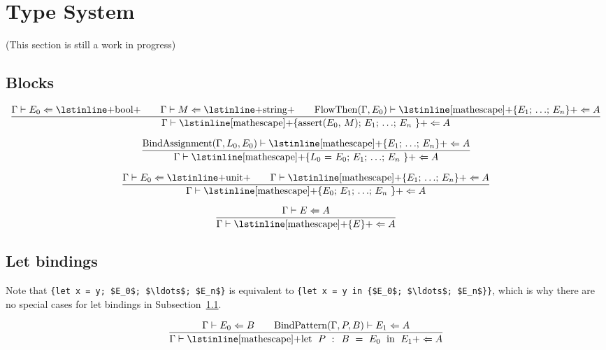 \section{Type System}
\label{sec:types}

(This section is still a work in progress)

\newcommand{\tcheck}[3]{#1 \vdash #2 \Leftarrow #3}
\newcommand{\tinfer}[3]{#1 \vdash #2 \Rightarrow #3}
\newcommand{\msail}[1]{\text{\lstinline[mathescape]+#1+}}

\subsection{Blocks}
\label{subsec:blocks}

\[
\frac{\tcheck{\Gamma}{E_0}{\text{\lstinline+bool+}}
      \qquad
      \tcheck{\Gamma}{M}{\text{\lstinline+string+}}
      \qquad
      \tcheck{\mathrm{FlowThen}(\Gamma, E_0)}{\text{\lstinline[mathescape]+\{$E_1$; $\ldots$; $E_n$\}+}}{A}}
     {\tcheck{\Gamma}{\text{\lstinline[mathescape]+\{assert($E_0$, $M$); $E_1$; $\ldots$; $E_n$ \}+}}{A}}
\]

\[
\frac{\tcheck{\mathrm{BindAssignment}(\Gamma, L_0, E_0)}{\text{\lstinline[mathescape]+\{$E_1$; $\ldots$; $E_n$\}+}}{A}}
     {\tcheck{\Gamma}{\text{\lstinline[mathescape]+\{$L_0$ = $E_0$; $E_1$; $\ldots$; $E_n$ \}+}}{A}}
\]

\[
\frac{\tcheck{\Gamma}{E_0}{\text{\lstinline+unit+}}
      \qquad
      \tcheck{\Gamma}{\text{\lstinline[mathescape]+\{$E_1$; $\ldots$; $E_n$\}+}}{A}}
     {\tcheck{\Gamma}{\text{\lstinline[mathescape]+\{$E_0$; $E_1$; $\ldots$; $E_n$ \}+}}{A}}
\]

\[
\frac{\tcheck{\Gamma}{E}{A}}
     {\tcheck{\Gamma}{\text{\lstinline[mathescape]+\{$E$\}+}}{A}}
\]

\subsection{Let bindings}

Note that \lstinline[mathescape]+{let x = y; $E_0$; $\ldots$; $E_n$}+
is equivalent to \lstinline[mathescape]+{let x = y in {$E_0$; $\ldots$; $E_n$}}+,
which is why there are no special cases for let bindings in Subsection~\ref{subsec:blocks}.

\[
\frac{\tcheck{\Gamma}{E_0}{B}
      \qquad
      \tcheck{\mathrm{BindPattern}(\Gamma, P, B)}{E_1}{A}}
     {\tcheck{\Gamma}{\msail{let $\;P\;$ : $\;B\;$ = $\;E_0\;$ in $\;E_1$}}{A}}
\]

